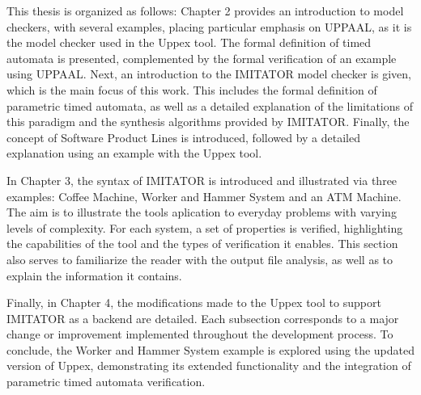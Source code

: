 This thesis is organized as follows: Chapter 2 provides an introduction to model checkers, with several examples, placing particular emphasis on UPPAAL, as it is the model checker used in the Uppex tool. The formal definition of timed automata is presented, complemented by the formal verification of an example using UPPAAL. Next, an introduction to the IMITATOR model checker is given, which is the main focus of this work. This includes the formal definition of parametric timed automata, as well as a detailed explanation of the limitations of this paradigm and the synthesis algorithms provided by IMITATOR. Finally, the concept of Software Product Lines is introduced, followed by a detailed explanation using an example with the Uppex tool.

In Chapter 3, the syntax of IMITATOR is introduced and illustrated via three examples: Coffee Machine, Worker and Hammer System and an ATM Machine. The aim is to illustrate the tools aplication to everyday problems with varying levels of complexity. For each system, a set of properties is verified, highlighting the capabilities of the tool and the types of verification it enables. This section also serves to familiarize the reader with the output file analysis, as well as to explain the information it contains.

Finally, in Chapter 4, the modifications made to the Uppex tool to support IMITATOR as a backend are detailed. Each subsection corresponds to a major change or improvement implemented throughout the development process. To conclude, the Worker and Hammer System example is explored using the updated version of Uppex, demonstrating its extended functionality and the integration of parametric timed automata verification.